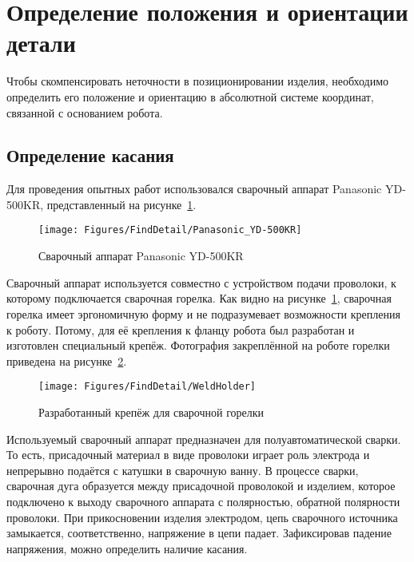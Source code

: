 \section{Определение положения и ориентации детали}
Чтобы скомпенсировать неточности в позиционировании изделия, необходимо определить его положение и ориентацию в абсолютной системе координат, связанной с основанием робота.

\subsection{Определение касания}
Для проведения опытных работ использовался сварочный аппарат Panasonic YD-500KR, представленный на рисунке~\ref{fig:FindDetail:Panasonic_YD-500KR}.

\begin{figure}[H]
    \centering
    \vspace{14pt}
    \texttt{[image: Figures/FindDetail/Panasonic\_YD-500KR]}
    \caption{Сварочный аппарат Panasonic YD-500KR}
    \label{fig:FindDetail:Panasonic_YD-500KR}
\end{figure}

Сварочный аппарат используется совместно с устройством подачи проволоки, к которому подключается сварочная горелка.
Как видно на рисунке~\ref{fig:FindDetail:Panasonic_YD-500KR}, сварочная горелка имеет эргономичную форму и не подразумевает возможности крепления к роботу.
Потому, для её крепления к фланцу робота был разработан и изготовлен специальный крепёж.
Фотография закреплённой на роботе горелки приведена на рисунке~\ref{fig:FindDetail:WeldHolder}.

\begin{figure}[H]
    \centering
    \vspace{14pt}
    \texttt{[image: Figures/FindDetail/WeldHolder]}
    \caption{Разработанный крепёж для сварочной горелки}
    \label{fig:FindDetail:WeldHolder}
\end{figure}

Используемый сварочный аппарат предназначен для полуавтоматической сварки.
То есть, присадочный материал в виде проволоки играет роль электрода и непрерывно подаётся с катушки в сварочную ванну.
В процессе сварки, сварочная дуга образуется между присадочной проволокой и изделием, которое подключено к выходу сварочного аппарата с полярностью, обратной полярности проволоки.
При прикосновении изделия электродом, цепь сварочного источника замыкается, соответственно, напряжение в цепи падает.
Зафиксировав падение напряжения, можно определить наличие касания.

